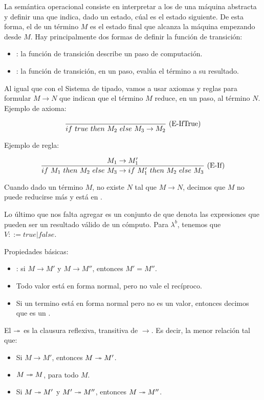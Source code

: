 La semántica operacional consiste en interpretar a los  de una máquina abstracta y definir una  que indica, dado un estado, cúal es el estado siguiente. De esta forma, el  de un término $M$ es el estado final que alcanza la máquina empezando desde $M$. Hay principalmente dos formas de definir la función de transición:

\begin{itemize}
  \item {}: la función de transición describe un paso de computación.
  \item {}: la función de transición, en un paso, evalúa el término a su resultado.
\end{itemize}

Al igual que con el Sistema de tipado, vamos a usar axiomas y reglas para formular  $M\to N$ que indican que el término $M$ reduce, en un paso, al término $N$. Ejemplo de axioma:

\[\frac{}{if\ true\ then\ M_2\ else\ M_3 \to M_2}\ \text{(E-IfTrue)}\]

Ejemplo de regla:

\[\frac{M_1 \to M_1'}{if\ M_1\ then\ M_2\ else\ M_3 \to if\ M_1'\ then\ M_2\ else\ M_3}\ \text{(E-If)}\]

Cuando dado un término $M$, no existe $N$ tal que $M\to N$, decimos que $M$ no puede reducirse más y está en .

Lo último que nos falta agregar es un conjunto de  que denota las expresiones que pueden ser un resultado válido de un cómputo. Para $\lambda^b$, tenemos que $V ::= true \vert false$.

Propiedades básicas:

\begin{itemize}
  \item {}: si $M \to M'$ y $M \to M''$, entonces $M'= M''$.
  \item Todo valor está en forma normal, pero no vale el recíproco.
  \item Si un termino está en forma normal pero no es un valor, entonces decimos que es un .
\end{itemize}

El  $\twoheadrightarrow$ es la clausura reflexiva, transitiva de $\to$. Es decir, la menor relación tal que:

\begin{itemize}
  \item Si $M\to M'$, entonces $M\twoheadrightarrow M'$.
  \item $M\twoheadrightarrow M$, para todo $M$.
  \item Si $M \twoheadrightarrow M'$ y $M' \twoheadrightarrow M''$, entonces $M \twoheadrightarrow M''$.
\end{itemize}


